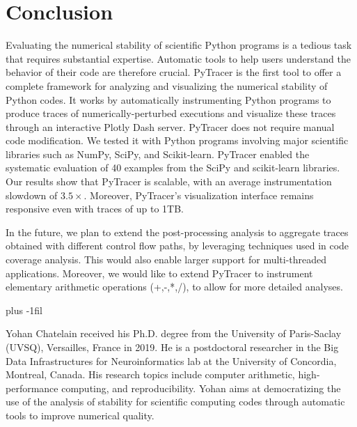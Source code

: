 \documentclass[10pt,journal,compsoc]{IEEEtran}
\newcommand{\pytracer}[0]{PyTracer\xspace}
\begin{document}
\section{Conclusion}

Evaluating the numerical stability of scientific Python programs is a tedious
task that requires substantial expertise. Automatic tools to help users
understand the behavior of their code are therefore crucial. \pytracer is the
first tool to offer a complete framework for analyzing and visualizing the
numerical stability of Python codes. It works by automatically instrumenting
Python programs to produce traces of numerically-perturbed executions and
visualize these traces through an interactive Plotly Dash server. \pytracer does
not require manual code modification. We tested it with Python programs
involving major scientific libraries such as NumPy, SciPy, and Scikit-learn.
\pytracer enabled the systematic evaluation of 40 examples from the SciPy and
scikit-learn libraries. Our results show that \pytracer is scalable, with an
average instrumentation slowdown of $3.5\times$. Moreover, \pytracer's
visualization interface remains responsive even with traces of up to 1TB.

In the future, we plan to extend the post-processing analysis to aggregate
traces obtained with different control flow paths, by leveraging techniques used
in code coverage analysis. This would also enable larger support for
multi-threaded applications. Moreover, we would like to extend \pytracer to
instrument elementary arithmetic operations (+,-,*,/), to allow for more
detailed analyses.

\ifCLASSOPTIONcaptionsoff
    \newpage
\fi




\baselineskip plus -1fil
\begin{IEEEbiography}{Yohan
        Chatelain} received his Ph.D. degree from the University of Paris-Saclay
    (UVSQ), Versailles, France in 2019. He is a postdoctoral researcher in
    the Big Data Infrastructures for Neuroinformatics lab at the University
    of Concordia, Montreal, Canada. His research topics include computer
    arithmetic, high-performance computing, and reproducibility. Yohan aims
    at democratizing the use of the analysis of stability for scientific
    computing codes through automatic tools to improve numerical quality.
\end{IEEEbiography}
\end{document}

